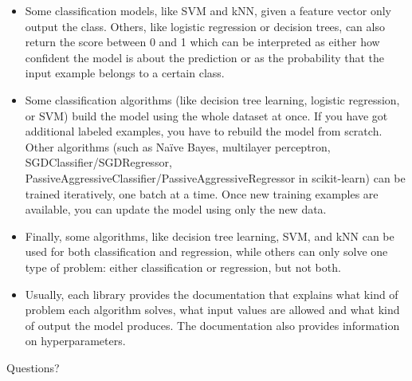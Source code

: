 \documentclass[9pt,dvipsnames]{beamer}
\begin{document}
\begin{frame}
	\begin{itemize}
		\item Some classification models, like SVM and kNN, given a feature vector only output the class. Others, like logistic regression or decision trees, can also return the score between 0 and 1 which can be interpreted as either how confident the model is about the prediction or as the probability that the input example belongs to a certain class.
		\item Some classification algorithms (like decision tree learning, logistic regression, or SVM) build the model using the whole dataset at once. If you have got additional labeled examples, you have to rebuild the model from scratch. Other algorithms (such as Naïve Bayes, multilayer perceptron, SGDClassifier/SGDRegressor, PassiveAggressiveClassifier/PassiveAggressiveRegressor in scikit-learn) can be trained iteratively, one batch at a time. Once new training examples are available, you can update the model using only the new data.
	\end{itemize}
\end{frame}

\begin{frame}
	\begin{itemize}
		\item Finally, some algorithms, like decision tree learning, SVM, and kNN can be used for both classification and regression, while others can only solve one type of problem: either classification or regression, but not both.
		\item Usually, each library provides the documentation that explains what kind of problem each algorithm solves, what input values are allowed and what kind of output the model produces. The documentation also provides information on hyperparameters.
	\end{itemize}
\end{frame}

\begin{frame}
    \begin{center}
        \Huge Questions?
    \end{center}
\end{frame}
\end{document}
